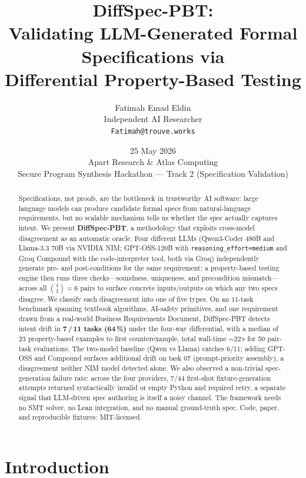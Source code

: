 \documentclass[11pt,a4paper]{article}
\title{\textbf{DiffSpec-PBT:}\\
Validating LLM-Generated Formal Specifications via\\
Differential Property-Based Testing}
\author{Fatimah Emad Eldin\\\small Independent AI Researcher\\\small\texttt{Fatimah@trouve.works}}
\date{25 May 2026\\\small Apart Research \& Atlas Computing\\\small Secure Program Synthesis Hackathon — Track 2 (Specification Validation)}
\begin{document}
\maketitle

\begin{abstract}
\noindent
Specifications, not proofs, are the bottleneck in trustworthy AI
software: large language models can produce candidate formal specs
from natural-language requirements, but no scalable mechanism tells
us whether the spec actually captures intent. We present
\textbf{DiffSpec-PBT}, a methodology that exploits cross-model
disagreement as an automatic oracle. Four different LLMs
(Qwen3-Coder 480B and Llama-3.3 70B via NVIDIA NIM; GPT-OSS-120B
with \texttt{reasoning\_effort=medium} and Groq Compound with the
code-interpreter tool, both via Groq) independently generate pre-
and post-conditions for the same requirement; a property-based
testing engine then runs three checks—soundness, uniqueness, and
precondition mismatch—across all $\binom{4}{2}=6$ pairs to surface
concrete inputs/outputs on which any two specs disagree. We classify each disagreement into one of five
types. On an 11-task benchmark spanning textbook algorithms, AI-safety
primitives, and one requirement drawn from a real-world Business
Requirements Document, DiffSpec-PBT detects intent drift in
\textbf{7\,/\,11 tasks (64\,\%)} under the four-way differential,
with a median of 23 property-based examples to first counterexample,
total wall-time $\sim$22\,s for 50 pair-task evaluations. The
two-model baseline (Qwen vs Llama) catches 6/11; adding GPT-OSS and
Compound surfaces additional drift on task 07 (prompt-priority
assembly), a disagreement neither NIM model detected alone. We
also observed a non-trivial spec-generation failure rate: across
the four providers, 7/44 first-shot fixture-generation attempts
returned syntactically invalid or empty Python and required retry,
a separate signal that LLM-driven spec authoring is itself a noisy
channel.
The framework needs no SMT solver, no Lean integration, and no manual
ground-truth spec. Code, paper, and reproducible fixtures: MIT-licensed.
\end{abstract}

\section{Introduction}
\end{document}
